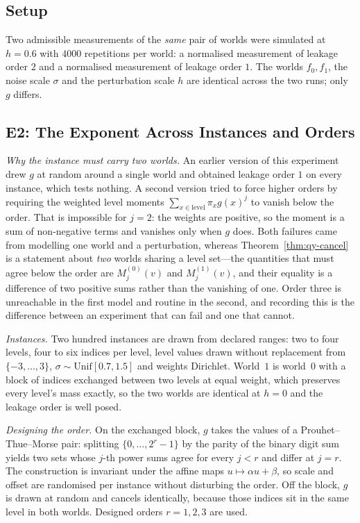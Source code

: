 \subsection{Setup}

Two admissible measurements of the \emph{same} pair of worlds were simulated at $h=0.6$ with
$4000$ repetitions per world: a normalised measurement of leakage order $2$ and a normalised
measurement of leakage order $1$. The worlds $f_{0},f_{1}$, the noise scale $\sigma$ and the
perturbation scale $h$ are identical across the two runs; only $g$ differs.

\subsection{E2: The Exponent Across Instances and Orders}
\label{sec:qy-e2}

\emph{Why the instance must carry two worlds.} An earlier version of this experiment drew $g$
at random around a single world and obtained leakage order $1$ on every instance, which tests
nothing. A second version tried to force higher orders by requiring the weighted level moments
$\sum_{x\in\text{level}}\pi_{x}g(x)^{j}$ to vanish below the order. That is impossible for
$j=2$: the weights are positive, so the moment is a sum of non-negative terms and vanishes
only when $g$ does. Both failures came from modelling one world and a perturbation, whereas
Theorem~\ref{thm:qy-cancel} is a statement about \emph{two} worlds sharing a level set---the
quantities that must agree below the order are $M^{(0)}_{j}(v)$ and $M^{(1)}_{j}(v)$, and
their equality is a difference of two positive sums rather than the vanishing of one. Order
three is unreachable in the first model and routine in the second, and recording this is the
difference between an experiment that can fail and one that cannot.

\emph{Instances.} Two hundred instances are drawn from declared ranges: two to four levels,
four to six indices per level, level values drawn without replacement from
$\{-3,\dots,3\}$, $\sigma\sim\mathrm{Unif}[0.7,1.5]$ and weights Dirichlet. World~$1$ is
world~$0$ with a block of indices exchanged between two levels at equal weight, which
preserves every level's mass exactly, so the two worlds are identical at $h=0$ and the
leakage order is well posed.

\emph{Designing the order.} On the exchanged block, $g$ takes the values of a
Prouhet--Thue--Morse pair: splitting $\{0,\dots,2^{r}-1\}$ by the parity of the binary digit
sum yields two sets whose $j$-th power sums agree for every $j<r$ and differ at $j=r$. The
construction is invariant under the affine maps $u\mapsto\alpha u+\beta$, so scale and offset
are randomised per instance without disturbing the order. Off the block, $g$ is drawn at
random and cancels identically, because those indices sit in the same level in both worlds.
Designed orders $r=1,2,3$ are used.

